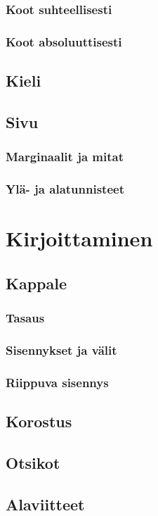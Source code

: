 \documentclass[a4paper,10pt,notitlepage,oneside]{book}
\begin{document}
\subsection{Koot suhteellisesti}
\label{luku:fontti_suhteellinen}
\subsection{Koot absoluuttisesti}
\label{luku:fontti_absoluuttinen}
\section{Kieli}
\label{luku:kieliasetukset}
\section{Sivu}
\label{luku:sivuasetukset}
\subsection{Marginaalit ja mitat}
\subsection{Ylä- ja alatunnisteet}

\chapter{Kirjoittaminen}
\section{Kappale}
\subsection{Tasaus}
\subsection{Sisennykset ja välit}
\subsection{Riippuva sisennys}
\section{Korostus}
\section{Otsikot}
\section{Alaviitteet}
\end{document}
